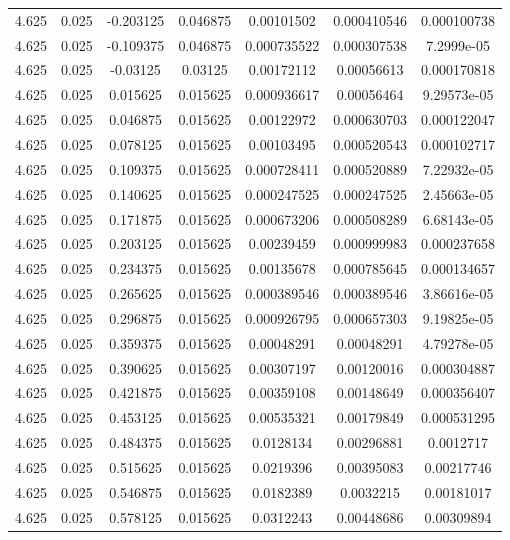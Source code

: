 \begin{table}[bh]
\begin{center}
{\begin{tabular}{ccccccc}
4.625	 & 0.025 & 	-0.203125	 & 0.046875	 & 0.00101502	 & 0.000410546	 & 0.000100738 \\ 
4.625	 & 0.025 & 	-0.109375	 & 0.046875	 & 0.000735522	 & 0.000307538	 & 7.2999e-05 \\ 
4.625	 & 0.025 & 	-0.03125	 & 0.03125	 & 0.00172112	 & 0.00056613	 & 0.000170818 \\ 
4.625	 & 0.025 & 	0.015625	 & 0.015625	 & 0.000936617	 & 0.00056464	 & 9.29573e-05 \\ 
4.625	 & 0.025 & 	0.046875	 & 0.015625	 & 0.00122972	 & 0.000630703	 & 0.000122047 \\ 
4.625	 & 0.025 & 	0.078125	 & 0.015625	 & 0.00103495	 & 0.000520543	 & 0.000102717 \\ 
4.625	 & 0.025 & 	0.109375	 & 0.015625	 & 0.000728411	 & 0.000520889	 & 7.22932e-05 \\ 
4.625	 & 0.025 & 	0.140625	 & 0.015625	 & 0.000247525	 & 0.000247525	 & 2.45663e-05 \\ 
4.625	 & 0.025 & 	0.171875	 & 0.015625	 & 0.000673206	 & 0.000508289	 & 6.68143e-05 \\ 
4.625	 & 0.025 & 	0.203125	 & 0.015625	 & 0.00239459	 & 0.000999983	 & 0.000237658 \\ 
4.625	 & 0.025 & 	0.234375	 & 0.015625	 & 0.00135678	 & 0.000785645	 & 0.000134657 \\ 
4.625	 & 0.025 & 	0.265625	 & 0.015625	 & 0.000389546	 & 0.000389546	 & 3.86616e-05 \\ 
4.625	 & 0.025 & 	0.296875	 & 0.015625	 & 0.000926795	 & 0.000657303	 & 9.19825e-05 \\ 
4.625	 & 0.025 & 	0.359375	 & 0.015625	 & 0.00048291	 & 0.00048291	 & 4.79278e-05 \\ 
4.625	 & 0.025 & 	0.390625	 & 0.015625	 & 0.00307197	 & 0.00120016	 & 0.000304887 \\ 
4.625	 & 0.025 & 	0.421875	 & 0.015625	 & 0.00359108	 & 0.00148649	 & 0.000356407 \\ 
4.625	 & 0.025 & 	0.453125	 & 0.015625	 & 0.00535321	 & 0.00179849	 & 0.000531295 \\ 
4.625	 & 0.025 & 	0.484375	 & 0.015625	 & 0.0128134	 & 0.00296881	 & 0.0012717 \\ 
4.625	 & 0.025 & 	0.515625	 & 0.015625	 & 0.0219396	 & 0.00395083	 & 0.00217746 \\ 
4.625	 & 0.025 & 	0.546875	 & 0.015625	 & 0.0182389	 & 0.0032215	 & 0.00181017 \\ 
4.625	 & 0.025 & 	0.578125	 & 0.015625	 & 0.0312243	 & 0.00448686	 & 0.00309894 \\ 

\end{tabular}}
\end{center}
\end{table}
